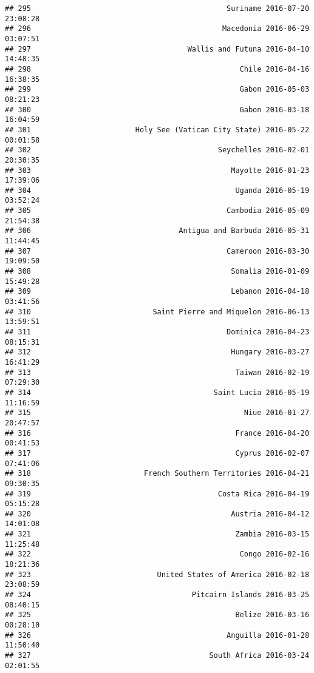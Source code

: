 \documentclass[
]{article}
\begin{document}
\begin{verbatim}
## 295                                             Suriname 2016-07-20 23:08:28
## 296                                            Macedonia 2016-06-29 03:07:51
## 297                                    Wallis and Futuna 2016-04-10 14:48:35
## 298                                                Chile 2016-04-16 16:38:35
## 299                                                Gabon 2016-05-03 08:21:23
## 300                                                Gabon 2016-03-18 16:04:59
## 301                        Holy See (Vatican City State) 2016-05-22 00:01:58
## 302                                           Seychelles 2016-02-01 20:30:35
## 303                                              Mayotte 2016-01-23 17:39:06
## 304                                               Uganda 2016-05-19 03:52:24
## 305                                             Cambodia 2016-05-09 21:54:38
## 306                                  Antigua and Barbuda 2016-05-31 11:44:45
## 307                                             Cameroon 2016-03-30 19:09:50
## 308                                              Somalia 2016-01-09 15:49:28
## 309                                              Lebanon 2016-04-18 03:41:56
## 310                            Saint Pierre and Miquelon 2016-06-13 13:59:51
## 311                                             Dominica 2016-04-23 08:15:31
## 312                                              Hungary 2016-03-27 16:41:29
## 313                                               Taiwan 2016-02-19 07:29:30
## 314                                          Saint Lucia 2016-05-19 11:16:59
## 315                                                 Niue 2016-01-27 20:47:57
## 316                                               France 2016-04-20 00:41:53
## 317                                               Cyprus 2016-02-07 07:41:06
## 318                          French Southern Territories 2016-04-21 09:30:35
## 319                                           Costa Rica 2016-04-19 05:15:28
## 320                                              Austria 2016-04-12 14:01:08
## 321                                               Zambia 2016-03-15 11:25:48
## 322                                                Congo 2016-02-16 18:21:36
## 323                             United States of America 2016-02-18 23:08:59
## 324                                     Pitcairn Islands 2016-03-25 08:40:15
## 325                                               Belize 2016-03-16 00:28:10
## 326                                             Anguilla 2016-01-28 11:50:40
## 327                                         South Africa 2016-03-24 02:01:55

\end{verbatim}
\end{document}
